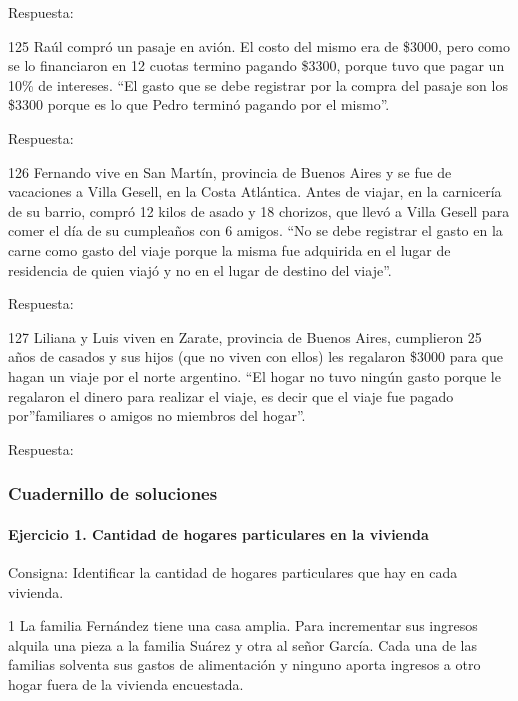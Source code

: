 \documentclass[
  openany]{book}
\begin{document}
Respuesta:

125 Raúl compró un pasaje en avión. El costo del mismo era de \$3000, pero como se lo financiaron en 12 cuotas termino pagando \$3300, porque tuvo que pagar un 10\% de intereses. ``El gasto que se debe registrar por la compra del pasaje son los \$3300 porque es lo que Pedro terminó pagando por el mismo''.

Respuesta:

126 Fernando vive en San Martín, provincia de Buenos Aires y se fue de vacaciones a Villa Gesell, en la Costa Atlántica. Antes de viajar, en la carnicería de su barrio, compró 12 kilos de asado y 18 chorizos, que llevó a Villa Gesell para comer el día de su cumpleaños con 6 amigos. ``No se debe registrar el gasto en la carne como gasto del viaje porque la misma fue adquirida en el lugar de residencia de quien viajó y no en el lugar de destino del viaje''.

Respuesta:

127 Liliana y Luis viven en Zarate, provincia de Buenos Aires, cumplieron 25 años de casados y sus hijos (que no viven con ellos) les regalaron \$3000 para que hagan un viaje por el norte argentino. ``El hogar no tuvo ningún gasto porque le regalaron el dinero para realizar el viaje, es decir que el viaje fue pagado por''familiares o amigos no miembros del hogar''.

Respuesta:

\hypertarget{cuadernillo-de-soluciones}{%
\subsubsection{Cuadernillo de soluciones}\label{cuadernillo-de-soluciones}}

\hypertarget{ejercicio-1.-cantidad-de-hogares-particulares-en-la-vivienda-1}{%
\paragraph{Ejercicio 1. Cantidad de hogares particulares en la vivienda}\label{ejercicio-1.-cantidad-de-hogares-particulares-en-la-vivienda-1}}

Consigna: Identificar la cantidad de hogares particulares que hay en cada vivienda.

1 La familia Fernández tiene una casa amplia. Para incrementar sus ingresos alquila una pieza a la familia Suárez y otra al señor García. Cada una de las familias solventa sus gastos de alimentación y ninguno aporta ingresos a otro hogar fuera de la vivienda encuestada.
\end{document}
